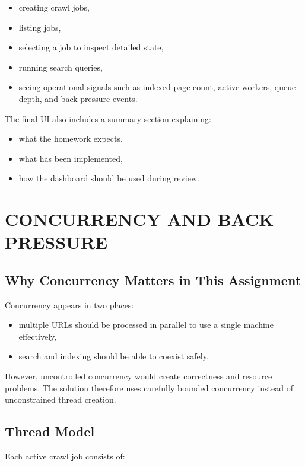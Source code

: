 \documentclass[pdftex,12pt,a4paper]{article}
\begin{document}
\begin{itemize}
    \item creating crawl jobs,
    \item listing jobs,
    \item selecting a job to inspect detailed state,
    \item running search queries,
    \item seeing operational signals such as indexed page count, active workers, queue depth, and back-pressure events.
\end{itemize}

The final UI also includes a summary section explaining:

\begin{itemize}
    \item what the homework expects,
    \item what has been implemented,
    \item how the dashboard should be used during review.
\end{itemize}

\section{CONCURRENCY AND BACK PRESSURE}
\label{sec:concurrency_backpressure}

\subsection{Why Concurrency Matters in This Assignment}

Concurrency appears in two places:

\begin{itemize}
    \item multiple URLs should be processed in parallel to use a single machine effectively,
    \item search and indexing should be able to coexist safely.
\end{itemize}

However, uncontrolled concurrency would create correctness and resource problems. The solution therefore uses carefully bounded concurrency instead of unconstrained thread creation.

\subsection{Thread Model}

Each active crawl job consists of:
\end{document}
